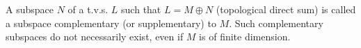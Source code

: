A subspace $N$ of a t.v.s. $L$ such that $L = M \oplus N$ (topological direct sum) is called a subspace complementary (or supplementary) to $M$. Such complementary subspaces do not necessarily exist, even if $M$ is of finite dimension.
